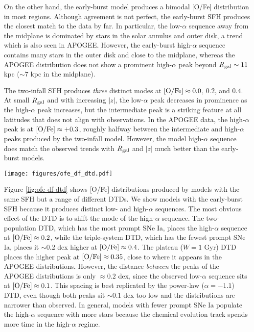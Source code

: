 \documentclass[twocolumn,twocolappendix,linenumbers]{aastex631}
\begin{document}
On the other hand, the early-burst model produces a bimodal [O/Fe] distribution in most regions. Although agreement is not perfect, the early-burst SFH produces the closest match to the data by far. In particular, the low-$\alpha$ sequence away from the midplane is dominated by stars in the solar annulus and outer disk, a trend which is also seen in APOGEE. However, the early-burst high-$\alpha$ sequence contains many stars in the outer disk and close to the midplane, whereas the APOGEE distribution does not show a prominent high-$\alpha$ peak beyond $R_{\rm gal}\sim11$ kpc ($\sim7$ kpc in the midplane). 

The two-infall SFH produces \textit{three} distinct modes at ${\rm [O/Fe]}\approx 0.0$, $0.2$, and $0.4$. At small $R_{\rm gal}$ and with increasing $|z|$, the low-$\alpha$ peak decreases in prominence as the high-$\alpha$ peak increases, but the intermediate peak is a striking feature at all latitudes that does not align with observations. In the APOGEE data, the high-$\alpha$ peak is at ${\rm [O/Fe]}\approx+0.3$, roughly halfway between the intermediate and high-$\alpha$ peaks produced by the two-infall model. However, the model high-$\alpha$ sequence does match the observed trends with $R_{\rm gal}$ and $|z|$ much better than the early-burst models.

\begin{figure*}
    \centering
    \texttt{[image: figures/ofe\_df\_dtd.pdf]}
    \caption{The same as Figure \ref{fig:ofe-df-sfh} but for different DTDs. In all cases an early-burst SFH is assumed.}
    \label{fig:ofe-df-dtd}
\end{figure*}

Figure \ref{fig:ofe-df-dtd} shows [O/Fe] distributions produced by models with the same SFH but a range of different DTDs. We show models with the early-burst SFH because it produces distinct low- and high-$\alpha$ sequences. The most obvious effect of the DTD is to shift the mode of the high-$\alpha$ sequence. The two-population DTD, which has the most prompt SNe Ia, places the high-$\alpha$ sequence at ${\rm [O/Fe]}\approx 0.2$, while the triple-system DTD, which has the fewest prompt SNe Ia, places it $\sim0.2$ dex higher at ${\rm [O/Fe]}\approx0.4$. The plateau ($W=1$ Gyr) DTD places the higher peak at ${\rm [O/Fe]}\approx0.35$, close to where it appears in the APOGEE distributions. However, the distance {\it between} the peaks of the APOGEE distributions is only $\approx0.2$ dex, since the observed low-$\alpha$ sequence sits at ${\rm [O/Fe]}\approx0.1$. This spacing is best replicated by the power-law ($\alpha=-1.1$) DTD, even though both peaks sit $\sim0.1$ dex too low and the distributions are narrower than observed. In general, models with fewer prompt SNe Ia populate the high-$\alpha$ sequence with more stars because the chemical evolution track spends more time in the high-$\alpha$ regime. 
\end{document}
